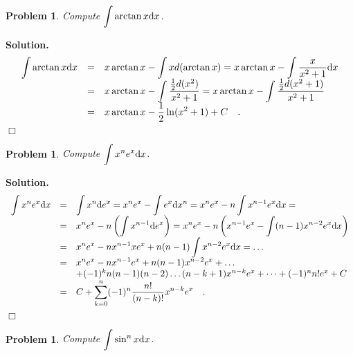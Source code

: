 \documentclass[12pt]{book}
\newenvironment{solution}{\medskip\noindent\textbf{Solution.} }{$\Box$}
\newtheorem{problem}[theorem]{Problem}
\begin{document}
\begin{problem}
Compute $\displaystyle\int \arctan x {\normalfont \text{d}} x$.
\end{problem}
\begin{solution}
\[
\begin{array}{rcl}
\displaystyle\int \arctan x {\normalfont \text{d}} x &=& x\displaystyle \arctan x - \int x d(\arctan x)= x\arctan x - \int \frac{x}{x^2+1}{\normalfont \text{d}} x\\
&=& \displaystyle  x\arctan x - \int \frac{\frac{1}2d(x^2)}{x^2+1}=  x\arctan x - \int \frac{\frac{1}2d(x^2+1)}{x^2+1}\\
&=&\displaystyle  x\arctan x - \frac12\ln (x^2+1) +C\quad .
\end{array}
\]
\end{solution}
\begin{problem}
Compute $\displaystyle \int x^n e^x {\normalfont \text{d}} x$.
\end{problem}
\begin{solution}
\[
\begin{array}{rcl}
\displaystyle\int x^n e^x {\normalfont \text{d}} x &=& \displaystyle\int x^n {\normalfont \text{d}} e^x= x^n e^x- \int  e^x {\normalfont \text{d}} x^n= x^n e^x- n\int  x^{n-1}e^x {\normalfont \text{d}} x=\\
&=&\displaystyle x^ne^x- n\left(\int x^{n-1}{\normalfont \text{d}} e^x \right)= x^ne^x - n\left(x^{n-1}e^x- \int (n-1)x^{n-2}e^x {\normalfont \text{d}} x\right)\\
&=&\displaystyle x^{n}e^x-nx^{n-1}xe^x+n(n-1)\int x^{n-2}e^x {\normalfont \text{d}} x =\dots\\
&=&\displaystyle x^ne^{x}- nx^{n-1}e^x + n(n-1 )x^{n-2 } e^x + \dots \\
&&+(-1)^kn(n-1)(n-2)\dots(n-k+1)x^{n-k}e^x+\dots +(-1)^n n! e^x+C\\
&=&\displaystyle C+\sum_{k=0}^{n} (-1)^n\frac{n!}{(n-k)!} x^{n-k} e^x \quad .
\end{array}
\]
\end{solution}
\begin{problem}
Compute $\displaystyle\int \sin^n x {\normalfont \text{d}} x$.

\end{problem}
\end{document}
